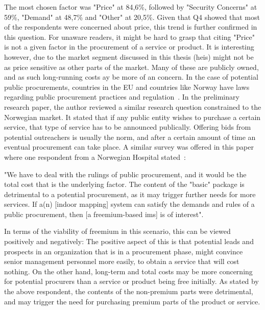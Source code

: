 The most chosen factor was "Price" at 84,6\%, followed by "Security Concerns" at 59\%, "Demand" at 48,7\% and "Other" at 20,5\%. Given that Q4 showed that most of the respondents were concerned about price, this trend is further confirmed in this question. For unaware readers, it might be hard to grasp that citing "Price" is not a given factor in the procurement of a service or product. It is interesting however, due to the market segment discussed in this thesis (\glspl{hei}) might not be as price sensitive as other parts of the market. Many of these are publicly owned, and as such long-running costs ay be more of an concern. In the case of potential public procurements, countries in the EU and countries like Norway have laws regarding public procurement practices and regulation~\cite{europeancommision}\cite{procurement}. In the preliminary research paper, the author reviewed a similar research question constrained to the Norwegian market. It stated that if any public entity wishes to purchase a certain service, that type of service has to be announced publically. Offering bids from potential outreachers is usually the norm, and after a certain amount of time an eventual procurement can take place. A similar survey was offered in this paper where one respondent from a Norwegian Hospital stated~\cite{kristiantagesen2015}:
\begin{displayquote}
"We have to deal with the rulings of public procurement, and it would be the total cost that is the underlying factor. The content of the "basic" package is detrimental to a potential procurement, as it may trigger further needs for more services. If a(n) [indoor mapping] system can satisfy the demands and rules of a public procurement, then [a freemium-based \gls{ims}] is of interest".
\end{displayquote}
In terms of the viability of freemium in this scenario, this can be viewed positively and negatively: The positive aspect of this is that potential leads and prospects in an organization that is in a procurement phase, might convince senior management personnel more easily, to obtain a service that will cost nothing. On the other hand, long-term and total costs may be more concerning for potential procurers than a service or product being free initially. As stated by the above respondent, the contents of the non-premium parts were detrimental, and may trigger the need for purchasing premium parts of the product or service.